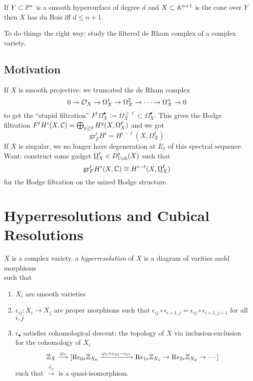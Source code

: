 \documentclass[12pt]{article}
\renewcommand{\gr}{\mathrm{gr}}
\newcommand{\R}{\mathrm{R}}
\begin{document}
\begin{exercise}
If $Y \subset \P^n$ is a smooth hypersurface of degree $d$ and $X \subset \A^{n+1}$ is the cone over $Y$ then $X$ has du Bois iff $d \le n + 1$. 
\end{exercise}

To do things the right way: study the filtered de Rham complex of a complex variety. 

\subsection{Motivation}

If $X$ is smooth projective: we truncated the de Rham complex
\[ 0 \to \struct{X} \to \Omega_X^1 \to \Omega_X^2 \to \cdots \to \Omega_X^n \to 0 \]
to get the ``stupid filtration'' $F^\ell \Omega_X^\bullet := \Omega^{\ge \ell}_X \subset \Omega^\bullet_X$. This gives the Hodge filtration $F^\ell H^i(X, \C) = \bigoplus_{p \ge \ell} H^q(X, \Omega_X^p)$ and we got
\[ \gr_F^\ell H^i = H^{i - \ell}(X, \Omega_X^\ell) \]
If $X$ is singular, we no longer have degeneration at $E_1$ of this spectral sequence. 
\bigskip\\
Want: construct some gadget $\ul{\Omega}_X^\ell \in D^\flat_{\mathrm{Coh}}(X)$ such that
\[ \gr_F^\ell H^i(X, \CC) \cong H^{i - \ell}(X, \ul{\Omega}_X^\ell) \]
for the Hodge filtration on the mixed Hodge structure. 

\section{Hyperresolutions and Cubical Resolutions}

\begin{defn}[Deligne]
$X$ is a complex variety, a \textit{hyperresolution} of $X$ is a diagram of varities andd morphisms 
\[ \]
such that
\begin{enumerate}
\item $X_i$ are smooth varieties
\item $\epsilon_{ij} : X_i \to X_j$ are proper morphisms such that $\epsilon_{ij} \circ \epsilon_{i+1,j} = \epsilon_{ij}  \circ \epsilon_{i+1,j+1}$ for all $i,j$
\item $\epsilon_\bullet$ satisfies cohomological descent: the topology of $X$ via inclusion-exclusion for the cohomology of $X_i$
\[ \Z_X \xrightarrow{\varphi_0} [\R \epsilon_{0 *} \Z_{X_0} \xrightarrow{\varphi_1 = \epsilon_{10} - \epsilon_{11}} \R \epsilon_{1 *} \Z_{X_1} \to \R \epsilon_{2 *} \Z_{X_2} \to \cdots] \]
such that $\xrightarrow{\varphi_0}$ is a quasi-isomorphism.
\end{enumerate}
\end{defn}
\end{document}

